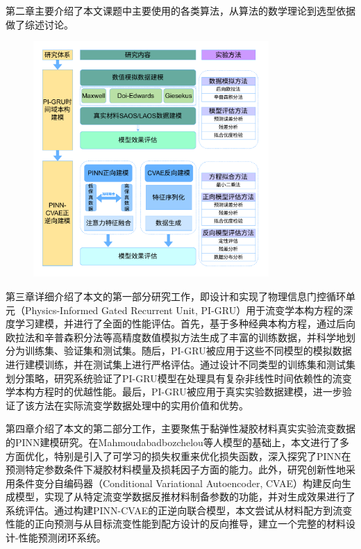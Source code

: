 第二章主要介绍了本文课题中主要使用的各类算法，从算法的数学理论到选型依据做了综述讨论。
\begin{figure}[htbp]
  \centering
  \includegraphics[width=0.8\textwidth]{Fig/HolisticResearchFramework.pdf}
\end{figure}


第三章详细介绍了本文的第一部分研究工作，即设计和实现了物理信息门控循环单元（Physics-Informed Gated Recurrent Unit, PI-GRU）用于流变学本构方程的深度学习建模，并进行了全面的性能评估。首先，基于多种经典本构方程，通过后向欧拉法和辛普森积分法等高精度数值模拟方法生成了丰富的训练数据，并科学地划分为训练集、验证集和测试集。随后，PI-GRU被应用于这些不同模型的模拟数据进行建模训练，并在测试集上进行严格评估。通过设计不同类型的训练集和测试集划分策略，研究系统验证了PI-GRU模型在处理具有复杂非线性时间依赖性的流变学本构方程时的优越性能。最后，PI-GRU被应用于真实实验数据建模，进一步验证了该方法在实际流变学数据处理中的实用价值和优势。

第四章介绍了本文的第二部分工作，主要聚焦于黏弹性凝胶材料真实实验流变数据的PINN建模研究。在Mahmoudabadbozchelou等人模型的基础上\cite{mahmoudabadbozchelouDatadrivenPhysicsinformedConstitutive2021}，本文进行了多方面优化，特别是引入了可学习的损失权重来优化损失函数，深入探究了PINN在预测特定参数条件下凝胶材料模量及损耗因子方面的能力。此外，研究创新性地采用条件变分自编码器（Conditional Variational Autoencoder, CVAE）构建反向生成模型，实现了从特定流变学数据反推材料制备参数的功能，并对生成效果进行了系统评估。通过构建PINN-CVAE的正逆向联合模型，本文尝试从材料配方到流变性能的正向预测与从目标流变性能到配方设计的反向推导，建立一个完整的材料设计-性能预测闭环系统。

